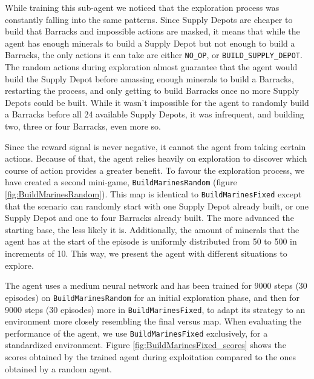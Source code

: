 While training this sub-agent we noticed that the exploration process was constantly falling into the same patterns. Since Supply Depots are cheaper to build that Barracks and impossible actions are masked, it means that while the agent has enough minerals to build a Supply Depot but not enough to build a Barracks, the only actions it can take are either \texttt{NO\_OP}, or \texttt{BUILD\_SUPPLY\_DEPOT}. The random actions during exploration almost guarantee that the agent would build the Supply Depot before amassing enough minerals to build a Barracks, restarting the process, and only getting to build Barracks once no more Supply Depots could be built. While it wasn't impossible for the agent to randomly build a Barracks before all 24 available Supply Depots, it was infrequent, and building two, three or four Barracks, even more so.

Since the reward signal is never negative, it cannot  the agent from taking certain actions. Because of that, the agent relies heavily on exploration to discover which course of action provides a greater benefit. To favour the exploration process, we have created a second mini-game, \texttt{BuildMarinesRandom} (figure \ref{fig:BuildMarinesRandom}). This map is identical to \texttt{BuildMarinesFixed} except that the scenario can randomly start with one Supply Depot already built, or one Supply Depot and one to four Barracks already built. The more advanced the starting base, the less likely it is. Additionally, the amount of minerals that the agent has at the start of the episode is uniformly distributed from 50 to 500 in increments of 10. This way, we present the agent with different situations to explore.

The agent uses a medium neural network and has been trained for 9000 steps (30 episodes) on \texttt{BuildMarinesRandom} for an initial exploration phase, and then for 9000 steps (30 episodes) more in \texttt{BuildMarinesFixed}, to adapt its strategy to an environment more closely resembling the final versus map. When evaluating the performance of the agent, we use \texttt{BuildMarinesFixed} exclusively, for a standardized environment. Figure \ref{fig:BuildMarinesFixed_scores} shows the scores obtained by the trained agent during exploitation compared to the ones obtained by a random agent.

